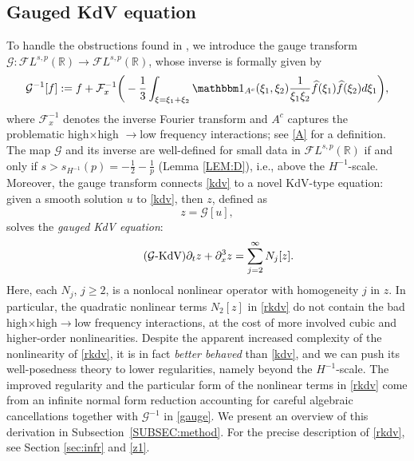 \documentclass[a4paper,
11pt,  reqno]{amsart}
\newcommand{\5}{\textup{V}}
\newcommand{\FL}{\mathcal{F} L}
\newcommand{\ft}{\widehat}
\newcommand{\ind}{\mathbbm 1}
\theoremstyle{remark}
\newcommand{\R}{\mathbb{R}}
\newcommand{\Ft}{{\mathcal{F}}}
\newcommand{\Gc}{\mathcal{G}}
\numberwithin{equation}{section}
\numberwithin{theorem}{section}
\begin{document}
\subsection{Gauged KdV equation}


To handle the obstructions found in \cite{Grunrock_ldv_hier}, we introduce the gauge transform $\Gc:\FL^{s,p}(\R) \to \FL^{s,p}(\R)$, whose inverse is formally given by 
    \begin{equation}
\label{gauge}
\Gc^{-1}[f] 
:= f + \Ft_x^{-1}\bigg( - \frac{1}{3} \int_{\xi=\xi_1+\xi_2} \ind_{A^c}(\xi_1,\xi_2) \frac{1}{\xi_1\xi_2} \ft{f}(\xi_1) \ft{f}(\xi_2) d\xi_1 \bigg), 
    \end{equation}
    where $\Ft^{-1}_x$ denotes the inverse Fourier transform and 
$A^c$ captures the problematic high$\times$high $\to$low frequency interactions; see \eqref{A} for a definition. 
The map $\Gc$ and its inverse are well-defined for small data in $\FL^{s,p}(\R)$ if and only if $s>s_{H^{-1}}(p)=-\frac12-\frac1p$ (Lemma \ref{LEM:D}), i.e., above the $H^{-1}$-scale. 
    Moreover,
the gauge transform connects \eqref{kdv} to a novel KdV-type equation: given a smooth solution $u$ to \eqref{kdv}, then $z$, defined as 
    \begin{equation}\label{defi_z_intro}
z=\mathcal{G}[u],
    \end{equation}
solves the \emph{gauged KdV equation}:
\begin{equation}
\label{rkdv}\tag{$\Gc$-KdV}
\partial_t z+ \partial_x^3 z = 
\sum_{j=2}^\infty 
N_j[z].
	\end{equation}
Here, 
each $N_j$, $j\ge 2$, is a nonlocal nonlinear operator with homogeneity $j$ in $z$. In particular, the quadratic nonlinear terms $N_2[z]$ in \eqref{rkdv} do not contain the bad high$\times$high$\to$low frequency interactions, at the cost of more involved cubic and higher-order nonlinearities. 
  Despite the apparent increased complexity of the nonlinearity of \eqref{rkdv}, it is in fact \emph{better behaved} than \eqref{kdv}, and we can push its well-posedness theory to lower regularities, namely beyond the $H^{-1}$-scale.
The improved regularity and the particular form of the nonlinear terms in \eqref{rkdv} come from an infinite normal form reduction
accounting for careful algebraic cancellations together with $\Gc^{-1}$ in \eqref{gauge}.
We present an overview of this derivation in Subsection~\ref{SUBSEC:method}. For the precise description of \eqref{rkdv}, see Section \ref{sec:infr} and \eqref{z1}.
\end{document}
